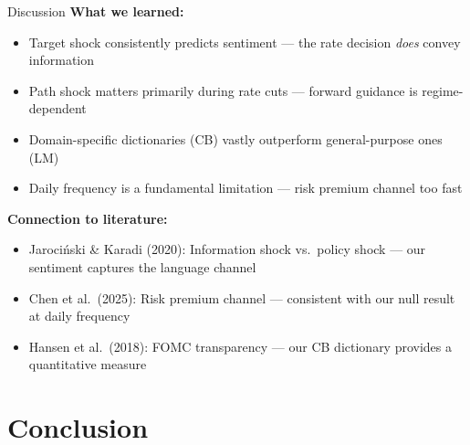 \documentclass[aspectratio=169, 11pt]{beamer}
\begin{document}
\begin{frame}{Discussion}
  \textbf{What we learned:}
  \begin{itemize}
    \item Target shock consistently predicts sentiment --- the rate decision \emph{does} convey information
    \item Path shock matters primarily during rate cuts --- forward guidance is regime-dependent
    \item Domain-specific dictionaries (CB) vastly outperform general-purpose ones (LM)
    \item Daily frequency is a fundamental limitation --- risk premium channel too fast
  \end{itemize}

  \vspace{0.5em}
  \textbf{Connection to literature:}
  \begin{itemize}
    \item Jaroci\'{n}ski \& Karadi (2020): Information shock vs.\ policy shock --- our sentiment captures the language channel
    \item Chen et al.\ (2025): Risk premium channel --- consistent with our null result at daily frequency
    \item Hansen et al.\ (2018): FOMC transparency --- our CB dictionary provides a quantitative measure
  \end{itemize}
\end{frame}

\section{Conclusion}
\end{document}

